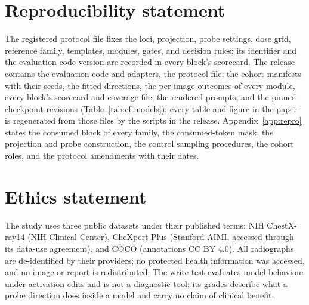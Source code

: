 \section*{Reproducibility statement}
The registered protocol file fixes the loci, projection, probe settings, dose grid, reference family, templates, modules, gates, and decision rules; its identifier and the evaluation-code version are recorded in every block's scorecard. The release contains the evaluation code and adapters, the protocol file, the cohort manifests with their seeds, the fitted directions, the per-image outcomes of every module, every block's scorecard and coverage file, the rendered prompts, and the pinned checkpoint revisions (Table~\ref{tab:cf-models}); every table and figure in the paper is regenerated from those files by the scripts in the release. Appendix~\ref{app:repro} states the consumed block of every family, the consumed-token mask, the projection and probe construction, the control sampling procedures, the cohort roles, and the protocol amendments with their dates.

\section*{Ethics statement}
The study uses three public datasets under their published terms: NIH ChestX-ray14 (NIH Clinical Center), CheXpert Plus (Stanford AIMI, accessed through its data-use agreement), and COCO (annotations CC BY 4.0). All radiographs are de-identified by their providers; no protected health information was accessed, and no image or report is redistributed. The write test evaluates model behaviour under activation edits and is not a diagnostic tool; its grades describe what a probe direction does inside a model and carry no claim of clinical benefit.
